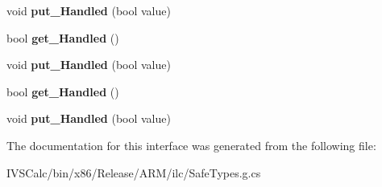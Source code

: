 \begin{DoxyCompactItemize}
void {\bfseries put\+\_\+\+Handled} (bool value)
\item 
\mbox{\label{interface_windows_1_1_u_i_1_1_core_1_1_i_core_window_event_args_a03b6ec31318cc38a7f708e7b3d080823}} 
bool {\bfseries get\+\_\+\+Handled} ()
\item 
\mbox{\label{interface_windows_1_1_u_i_1_1_core_1_1_i_core_window_event_args_ab296e2b8efbf657f47ebc4dd2d0e9753}} 
void {\bfseries put\+\_\+\+Handled} (bool value)
\item 
\mbox{\label{interface_windows_1_1_u_i_1_1_core_1_1_i_core_window_event_args_a03b6ec31318cc38a7f708e7b3d080823}} 
bool {\bfseries get\+\_\+\+Handled} ()
\item 
\mbox{\label{interface_windows_1_1_u_i_1_1_core_1_1_i_core_window_event_args_ab296e2b8efbf657f47ebc4dd2d0e9753}} 
void {\bfseries put\+\_\+\+Handled} (bool value)
\end{DoxyCompactItemize}


The documentation for this interface was generated from the following file\+:\begin{DoxyCompactItemize}
\item 
I\+V\+S\+Calc/bin/x86/\+Release/\+A\+R\+M/ilc/Safe\+Types.\+g.\+cs\end{DoxyCompactItemize}

